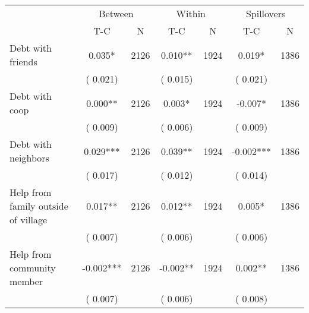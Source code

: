 
\begin{tabular}{l*{6}{c}}\hline&\multicolumn{2}{c}{Between}&\multicolumn{2}{c}{Within}&\multicolumn{2}{c}{Spillovers} \\ \cmidrule(r){2-3}\cmidrule(l){4-5}\cmidrule(l){6-7} & {T-C} & {N} & {T-C} & {N}  & {T-C}  & {N}  \\ \midrule
Debt with friends        &              0.035*      &       2126       &              0.010**      &       1924       &              0.019*      &       1386       \\
                       &       (       0.021)            &                               &       (       0.015)            &                               &       (       0.021)            &                               \\
Debt with coop        &              0.000**      &       2126       &              0.003*      &       1924       &             -0.007*      &       1386       \\
                       &       (       0.009)            &                               &       (       0.006)            &                               &       (       0.009)            &                               \\
Debt with neighbors        &              0.029***      &       2126       &              0.039**      &       1924       &             -0.002***      &       1386       \\
                       &       (       0.017)            &                               &       (       0.012)            &                               &       (       0.014)            &                               \\
Help from family outside of village        &              0.017**      &       2126       &              0.012**      &       1924       &              0.005*      &       1386       \\
                       &       (       0.007)            &                               &       (       0.006)            &                               &       (       0.006)            &                               \\
Help from community member        &             -0.002***      &       2126       &             -0.002**      &       1924       &              0.002**      &       1386       \\
                       &       (       0.007)            &                               &       (       0.006)            &                               &       (       0.008)            &                               \\

\end{tabular}
